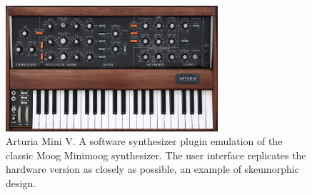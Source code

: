\begin{figure}[ht]
    \centering
    \includegraphics[width=0.7\textwidth]{figures/background/minimoog_arturia.jpg}
    \caption{Arturia Mini V. A software synthesizer plugin emulation of the classic Moog Minimoog synthesizer. The user interface replicates the hardware version as closely as possible, an example of skeumorphic design.}
    \label{fig:minimoog_arturia}
\end{figure}





